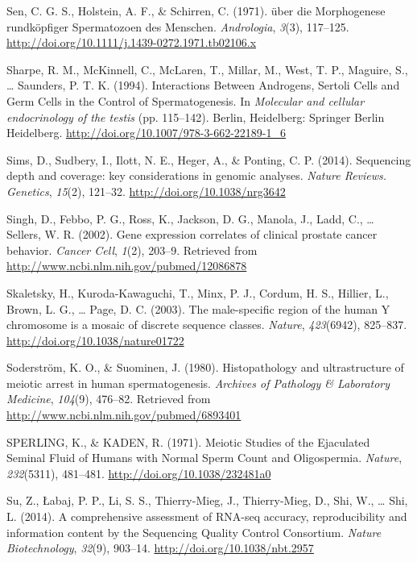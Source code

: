 \documentclass[12pt,twoside]{reedthesis}
\theoremstyle{definition}
\theoremstyle{definition}
\theoremstyle{remark}
\begin{document}
  \hypertarget{ref-Sen2009}{}
  Sen, C. G. S., Holstein, A. F., \& Schirren, C. (1971). über die
  Morphogenese rundköpfiger Spermatozoen des Menschen. \emph{Andrologia},
  \emph{3}(3), 117--125.
  \url{http://doi.org/10.1111/j.1439-0272.1971.tb02106.x}
  
  \hypertarget{ref-Sharpe1994}{}
  Sharpe, R. M., McKinnell, C., McLaren, T., Millar, M., West, T. P.,
  Maguire, S., \ldots{} Saunders, P. T. K. (1994). Interactions Between
  Androgens, Sertoli Cells and Germ Cells in the Control of
  Spermatogenesis. In \emph{Molecular and cellular endocrinology of the
  testis} (pp. 115--142). Berlin, Heidelberg: Springer Berlin Heidelberg.
  \url{http://doi.org/10.1007/978-3-662-22189-1_6}
  
  \hypertarget{ref-Sims2014}{}
  Sims, D., Sudbery, I., Ilott, N. E., Heger, A., \& Ponting, C. P.
  (2014). Sequencing depth and coverage: key considerations in genomic
  analyses. \emph{Nature Reviews. Genetics}, \emph{15}(2), 121--32.
  \url{http://doi.org/10.1038/nrg3642}
  
  \hypertarget{ref-Singh2002}{}
  Singh, D., Febbo, P. G., Ross, K., Jackson, D. G., Manola, J., Ladd, C.,
  \ldots{} Sellers, W. R. (2002). Gene expression correlates of clinical
  prostate cancer behavior. \emph{Cancer Cell}, \emph{1}(2), 203--9.
  Retrieved from \url{http://www.ncbi.nlm.nih.gov/pubmed/12086878}
  
  \hypertarget{ref-Skaletsky2003}{}
  Skaletsky, H., Kuroda-Kawaguchi, T., Minx, P. J., Cordum, H. S.,
  Hillier, L., Brown, L. G., \ldots{} Page, D. C. (2003). The
  male-specific region of the human Y chromosome is a mosaic of discrete
  sequence classes. \emph{Nature}, \emph{423}(6942), 825--837.
  \url{http://doi.org/10.1038/nature01722}
  
  \hypertarget{ref-Soderstrom1980}{}
  Soderström, K. O., \& Suominen, J. (1980). Histopathology and
  ultrastructure of meiotic arrest in human spermatogenesis.
  \emph{Archives of Pathology \& Laboratory Medicine}, \emph{104}(9),
  476--82. Retrieved from \url{http://www.ncbi.nlm.nih.gov/pubmed/6893401}
  
  \hypertarget{ref-SPERLING1971}{}
  SPERLING, K., \& KADEN, R. (1971). Meiotic Studies of the Ejaculated
  Seminal Fluid of Humans with Normal Sperm Count and Oligospermia.
  \emph{Nature}, \emph{232}(5311), 481--481.
  \url{http://doi.org/10.1038/232481a0}
  
  \hypertarget{ref-Su2014}{}
  Su, Z., Łabaj, P. P., Li, S. S., Thierry-Mieg, J., Thierry-Mieg, D.,
  Shi, W., \ldots{} Shi, L. (2014). A comprehensive assessment of RNA-seq
  accuracy, reproducibility and information content by the Sequencing
  Quality Control Consortium. \emph{Nature Biotechnology}, \emph{32}(9),
  903--14. \url{http://doi.org/10.1038/nbt.2957}
  
\end{document}
